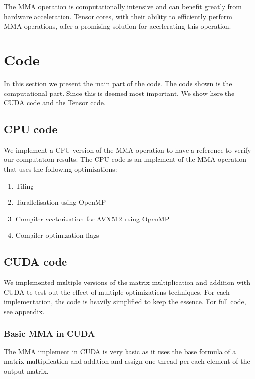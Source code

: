 \documentclass[conference]{IEEEtran}
\begin{document}
  The MMA operation is computationally intensive and can benefit greatly from hardware acceleration. 
  Tensor cores, with their ability to efficiently perform MMA operations, offer a promising solution 
  for accelerating this operation.
  
  
  \section{Code}
  In this section we present the main part of the code. The code shown is the computational part. Since this is
  deemed most important. We show here the CUDA code and the Tensor code.

  \subsection{CPU code}\label{sec:CPUCode}
  We implement a CPU version of the MMA operation to have a reference to verify our computation results.
  The CPU code is an implement of the MMA operation that uses the following optimizations:
  \begin{enumerate}
    \item Tiling
    \item Tarallelisation using OpenMP
    \item Compiler vectorisation for AVX512 using OpenMP
    \item Compiler optimization flags
  \end{enumerate}


  \subsection{CUDA code}\label{sec:CudaCode}
  We implemented multiple versions of the matrix multiplication and addition with CUDA to
  test out the effect of multiple optimizations techniques. For each implementation, 
  the code is heavily simplified to keep the essence. For full code, see appendix.

  \subsubsection[short]{Basic MMA in CUDA}
  The MMA implement in CUDA is very basic as it uses the base formula of a matrix multiplication
  and addition and assign one thread per each element of the output matrix.\cite{Cpp_programming}
\end{document}
